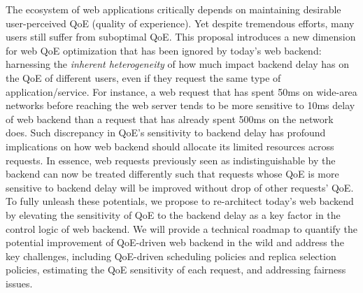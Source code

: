 The ecosystem of web applications critically depends on maintaining desirable user-perceived QoE (quality of experience).
Yet despite tremendous efforts,
many users still suffer from suboptimal QoE.
This proposal introduces a new dimension for web QoE optimization that has been ignored by today's web backend: harnessing the {\em inherent heterogeneity} of how much impact backend delay has on the QoE of different users, even if they request the same type of application/service.
For instance, a web request that has spent 50ms on wide-area networks before reaching the web server tends to be more sensitive to 10ms delay of web backend than a request that has already spent 500ms on the network does. 
Such discrepancy in QoE's sensitivity to backend delay has profound implications on how web backend should allocate its limited resources across requests.
In essence, web requests previously seen as indistinguishable by the backend can now be treated differently such that requests whose QoE is more sensitive to backend delay will be improved without drop of other requests' QoE.
To fully unleash these potentials, we propose to re-architect today's web backend by elevating the sensitivity of QoE to the backend delay as a key factor in the control logic of web backend.
We will provide a technical roadmap to quantify the potential improvement of QoE-driven web backend in the wild and address the key challenges, including QoE-driven scheduling policies and replica selection policies, estimating the QoE sensitivity of each request, and addressing fairness issues.


